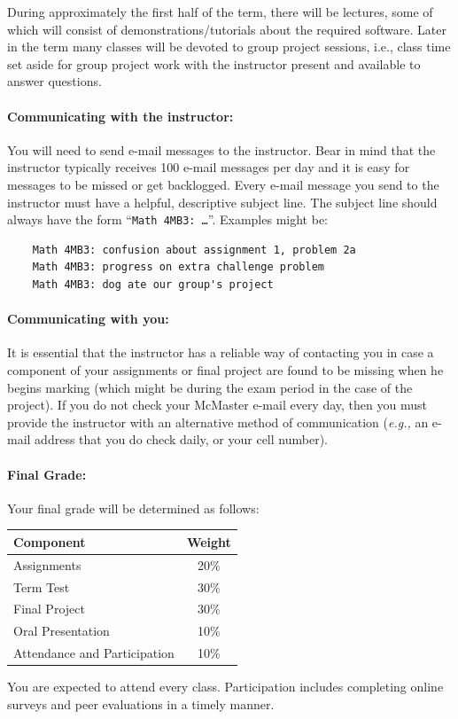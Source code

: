 \documentclass[12pt]{article}
\begin{document}
During approximately the first half of the term, there will be lectures, some of which will consist of demonstrations/tutorials about the required software.  Later in the term many classes will be devoted to group project sessions, i.e., class time set aside for group project work with the instructor present and available to answer questions.

\paragraph*{Communicating with the instructor:}

You will need to send e-mail messages to the instructor.  Bear in mind that the instructor typically receives 100 e-mail messages per day and it is easy for messages to be missed or get backlogged.  Every e-mail message you send to the instructor must have a helpful, descriptive subject line.  The subject line should always have the form ``{\tt Math 4MB3: \dots}''.  Examples might be:
\begin{verbatim}
    Math 4MB3: confusion about assignment 1, problem 2a
    Math 4MB3: progress on extra challenge problem
    Math 4MB3: dog ate our group's project
\end{verbatim}

\paragraph*{Communicating with you:}

It is essential that the instructor has a reliable way of contacting you in case a component of your assignments or final project are found to be missing when he begins marking (which might be during the exam period in the case of the project).  If you do not check your McMaster e-mail every day, then you must provide the instructor with an alternative method of communication (\emph{e.g.,} an e-mail address that you do check daily, or your cell number).

\paragraph*{Final Grade:}
Your final grade will be determined as follows:
%
\begin{center}
\begin{tabular}{l|c}
\bf Component & \bf Weight \\\hline
Assignments & 20\% \\
Term Test & 30\% \\
Final Project & 30\% \\
Oral Presentation & 10\% \\
Attendance and Participation & 10\% \\
\end{tabular}
\end{center}
\noindent You are expected to attend every class.  Participation
includes completing online surveys and peer evaluations in a timely
manner.
\end{document}
